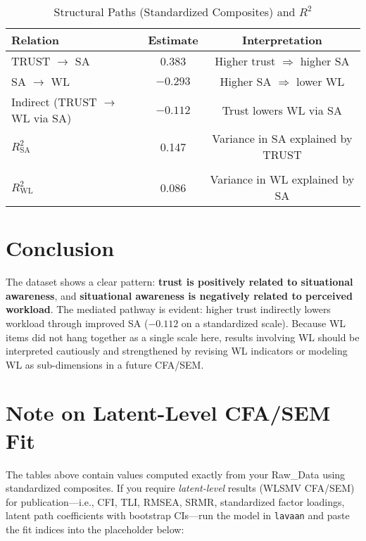 \documentclass[conference]{IEEEtran}
\begin{document}
\begin{table}[h]
\centering
\caption{Structural Paths (Standardized Composites) and $R^2$}
\begin{tabular}{lcc}
\toprule
Relation & Estimate & Interpretation \\
\midrule
TRUST $\rightarrow$ SA & 0.383 & Higher trust $\Rightarrow$ higher SA \\

SA $\rightarrow$ WL    & $-0.293$ & Higher SA $\Rightarrow$ lower WL \\

Indirect (TRUST $\rightarrow$ WL via SA) & $-0.112$ & Trust lowers WL via SA \\

$R^2_{\text{SA}}$ & 0.147 & Variance in SA explained by TRUST \\
\\
$R^2_{\text{WL}}$ & 0.086 & Variance in WL explained by SA \\
\bottomrule
\end{tabular}
\end{table}

\section{Conclusion}
The dataset shows a clear pattern: \textbf{trust is positively related to situational awareness}, and \textbf{situational awareness is negatively related to perceived workload}. The mediated pathway is evident: higher trust indirectly lowers workload through improved SA (\(-0.112\) on a standardized scale). Because WL items did not hang together as a single scale here, results involving WL should be interpreted cautiously and strengthened by revising WL indicators or modeling WL as sub-dimensions in a future CFA/SEM.

\section{Note on Latent-Level CFA/SEM Fit}
The tables above contain values computed exactly from your Raw\_Data using standardized composites. If you require \emph{latent-level} results (WLSMV CFA/SEM) for publication—i.e., CFI, TLI, RMSEA, SRMR, standardized factor loadings, latent path coefficients with bootstrap CIs—run the model in \texttt{lavaan} and paste the fit indices into the placeholder below:
\end{document}
